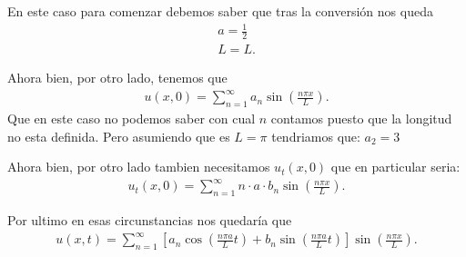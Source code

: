 \documentclass[12pt]{exam}
\begin{document}
\begin{enumerate}
  En este caso para comenzar debemos saber que tras la conversión nos queda
  \begin{align*}
    a = \frac{1}{2}\\
    L = L
  .\end{align*}

  Ahora bien, por otro lado, tenemos que
  \begin{align*}
    u\left( x,0 \right) = \sum_{n=1}^{\infty} a_n\sin\left( \frac{n\pi x}{L} \right) 
  .\end{align*}
  Que en este caso no podemos saber con cual $n$ contamos puesto que la longitud no esta definida. Pero asumiendo que es $L=\pi$ tendriamos que:
  $a_2 = 3$

  Ahora bien, por otro lado tambien necesitamos $u_t\left( x,0 \right) $ que en particular seria:
  \begin{align*}
    u_t\left( x,0 \right) = \sum_{n=1}^{\infty} n\cdot a\cdot b_n \sin\left( \frac{n\pi x}{L} \right) 
  .\end{align*}

  Por ultimo en esas circunstancias nos quedaría que
  \begin{align*}
  u\left( x,t \right) = \sum_{n=1}^{\infty} \left[ a_n \cos\left( \frac{n\pi a}{L}t \right) + b_n\sin\left( \frac{n\pi a }{L}t \right)  \right] \sin\left( \frac{n\pi x}{L} \right) 
  .\end{align*}
\end{enumerate}
\end{document}
